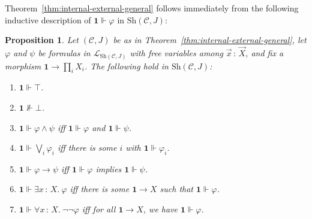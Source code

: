 \documentclass[11pt]{amsart}
\newcommand\cC{\mathcal{C}}
\newcommand\cL{\mathcal{L}}
\renewcommand\phi{\varphi}
\newcommand\Sh{\mathrm{Sh}}
\newcommand\tm{\mathbf{1}}
\newcommand\tolon{{\,:\,}}
\newcommand\vX{\vec{X}}
\newcommand\vx{\vec{x}}
\theoremstyle{definition}
\theoremstyle{remark}
\theoremstyle{plain}
\newtheorem{propn}[defn]{Proposition}
\begin{document}
Theorem~\ref{thm:internal-external-general} follows immediately from the following inductive description of \( \tm \Vdash \phi \) in \( \Sh(\cC,J) \):
\begin{propn}\label{propn:main-thm-main-lemma}
  Let \( (\cC,J) \) be as in Theorem~\ref{thm:internal-external-general}, let \( \phi \) and \( \psi \) be formulas in \( \cL_{\Sh(\cC,J)} \) with free variables among \( \vx \tolon \vX \), and fix a morphism \( \tm \to \prod_i X_i \).
  The following hold in \( \Sh(\cC,J) \):
  \begin{enumerate}
    \item
      \(\tm \Vdash \top\).
    \item
      \(\tm \not \Vdash \bot\).
    \item
      \(\tm \Vdash \phi \land \psi\)
      iff \(\tm \Vdash \phi\) and \(\tm \Vdash \psi\).
    \item
      \(\tm \Vdash \bigvee_i \phi_i\)
      iff there is some \(i\) with \(\tm \Vdash \phi_i\).
    \item
      \(\tm \Vdash \phi \to \psi\)
      iff \(\tm \Vdash \phi\) implies \(\tm \Vdash \psi\).
    \item
      \(\tm \Vdash \exists x \tolon X.\ \phi\)
      iff there is some \(\tm \to X\)
      such that \(\tm \Vdash \phi\).
    \item
      \(\tm \Vdash \forall x \tolon X.\ \lnot \lnot \phi\) iff
      for all \(\tm \to X\),
      we have \(\tm \Vdash \phi\).
  \end{enumerate}
\end{propn}
\end{document}
